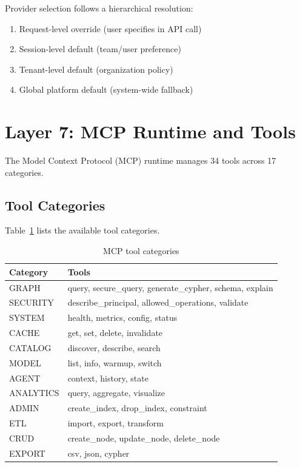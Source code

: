 \documentclass[a4paper,twoside]{sapthesis}
\begin{document}
Provider selection follows a hierarchical resolution:

\begin{enumerate}
    \item Request-level override (user specifies in API call)
    \item Session-level default (team/user preference)
    \item Tenant-level default (organization policy)
    \item Global platform default (system-wide fallback)
\end{enumerate}

\section{Layer 7: MCP Runtime and Tools}
\label{sec:layer7-mcp}

The Model Context Protocol (MCP) runtime manages 34 tools across 17 categories.

\subsection{Tool Categories}
\label{subsec:tool-categories}

Table~\ref{tab:tool-categories} lists the available tool categories.

\begin{table}[htbp]
\centering
\caption{MCP tool categories}
\label{tab:tool-categories}
\begin{tabular}{@{}ll@{}}
\toprule
\textbf{Category} & \textbf{Tools} \\
\midrule
GRAPH & query, secure\_query, generate\_cypher, schema, explain \\
SECURITY & describe\_principal, allowed\_operations, validate \\
SYSTEM & health, metrics, config, status \\
CACHE & get, set, delete, invalidate \\
CATALOG & discover, describe, search \\
MODEL & list, info, warmup, switch \\
AGENT & context, history, state \\
ANALYTICS & query, aggregate, visualize \\
ADMIN & create\_index, drop\_index, constraint \\
ETL & import, export, transform \\
CRUD & create\_node, update\_node, delete\_node \\
EXPORT & csv, json, cypher \\
\bottomrule
\end{tabular}
\end{table}
\end{document}

